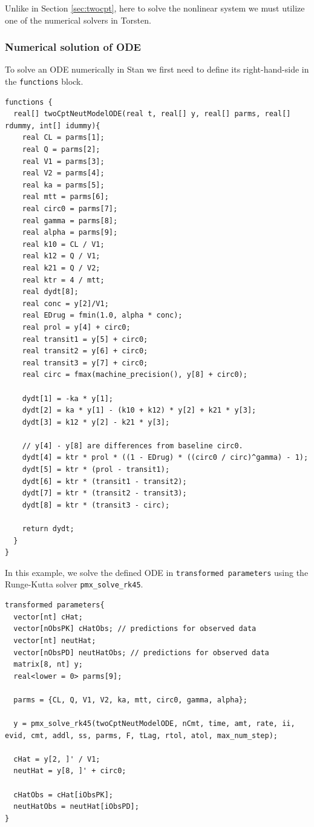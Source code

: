 Unlike in
Section \ref{sec:twocpt}, here to solve the nonlinear system we must
utilize one of the numerical solvers in Torsten.

\subsubsection{Numerical solution of ODE}
To solve an ODE numerically in Stan we first need to define
its right-hand-side in the \texttt{functions} block.
\begin{lstlisting}[style=stan, numbers=none] 
functions {
  real[] twoCptNeutModelODE(real t, real[] y, real[] parms, real[] rdummy, int[] idummy){
    real CL = parms[1];
    real Q = parms[2];
    real V1 = parms[3];
    real V2 = parms[4];
    real ka = parms[5];
    real mtt = parms[6];	
    real circ0 = parms[7];
    real gamma = parms[8];
    real alpha = parms[9];
    real k10 = CL / V1;
    real k12 = Q / V1;
    real k21 = Q / V2;
    real ktr = 4 / mtt;
    real dydt[8];
    real conc = y[2]/V1;
    real EDrug = fmin(1.0, alpha * conc);
    real prol = y[4] + circ0;
    real transit1 = y[5] + circ0;
    real transit2 = y[6] + circ0;
    real transit3 = y[7] + circ0;
    real circ = fmax(machine_precision(), y[8] + circ0);

    dydt[1] = -ka * y[1];
    dydt[2] = ka * y[1] - (k10 + k12) * y[2] + k21 * y[3];
    dydt[3] = k12 * y[2] - k21 * y[3];

    // y[4] - y[8] are differences from baseline circ0.
    dydt[4] = ktr * prol * ((1 - EDrug) * ((circ0 / circ)^gamma) - 1);
    dydt[5] = ktr * (prol - transit1);
    dydt[6] = ktr * (transit1 - transit2);
    dydt[7] = ktr * (transit2 - transit3);
    dydt[8] = ktr * (transit3 - circ);

    return dydt;
  }
}
\end{lstlisting}
In this example, we solve the defined ODE in \texttt{transformed parameters}
using the Runge-Kutta solver \texttt{pmx\_solve\_rk45}.
\begin{lstlisting}[style=stan, numbers=none] 
transformed parameters{
  vector[nt] cHat;
  vector[nObsPK] cHatObs; // predictions for observed data
  vector[nt] neutHat;
  vector[nObsPD] neutHatObs; // predictions for observed data
  matrix[8, nt] y;
  real<lower = 0> parms[9];

  parms = {CL, Q, V1, V2, ka, mtt, circ0, gamma, alpha};

  y = pmx_solve_rk45(twoCptNeutModelODE, nCmt, time, amt, rate, ii, evid, cmt, addl, ss, parms, F, tLag, rtol, atol, max_num_step);

  cHat = y[2, ]' / V1;
  neutHat = y[8, ]' + circ0;

  cHatObs = cHat[iObsPK];
  neutHatObs = neutHat[iObsPD];
}
\end{lstlisting}

